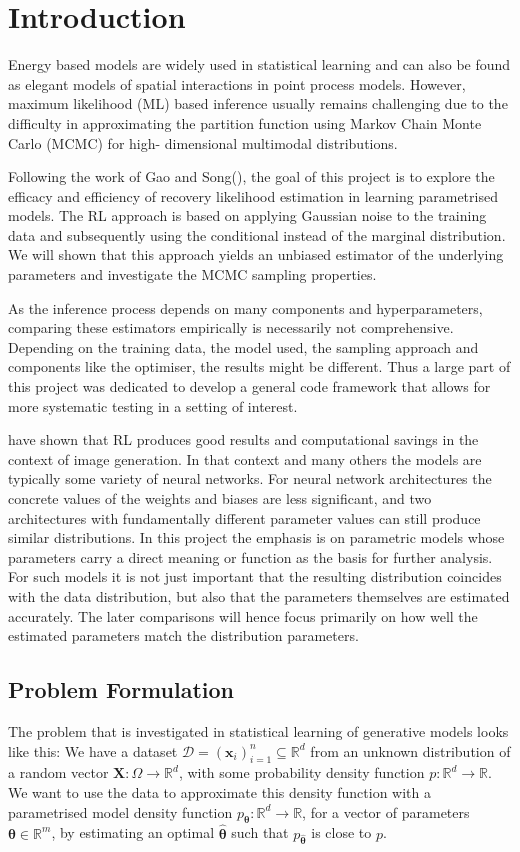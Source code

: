 \section{Introduction}

Energy based models are widely used in statistical learning and can also be found as elegant models of spatial interactions in point process models. 
However, maximum likelihood (ML) based inference usually remains challenging due to the difficulty in approximating the partition function using Markov Chain Monte Carlo (MCMC) for high- dimensional multimodal distributions.

Following the work of Gao and Song(\cite{Gao-Song2020}), the goal of this project is to explore the efficacy and efficiency of recovery likelihood estimation in learning parametrised models.
The RL approach is based on applying Gaussian noise to the training data and subsequently using the conditional instead of the marginal distribution.
We will shown that this approach yields an unbiased estimator of the underlying parameters and investigate the MCMC sampling properties. 

As the inference process depends on many components and hyperparameters, comparing these estimators empirically is necessarily not comprehensive.
Depending on the training data, the model used, the sampling approach and components like the optimiser, the results might be different.
Thus a large part of this project was dedicated to develop a general code framework that allows for more systematic testing in a setting of interest.

 have shown that RL produces good results and computational savings in the context of image generation.
In that context and many others the models are typically some variety of neural networks.
For neural network architectures the concrete values of the weights and biases are less significant, 
and two architectures with fundamentally different parameter values can still produce similar distributions.
In this project the emphasis is on parametric models whose parameters carry a direct meaning or function as the basis for further analysis.
For such models it is not just important that the resulting distribution coincides with the data distribution, 
but also that the parameters themselves are estimated accurately.
The later comparisons will hence focus primarily on how well the estimated parameters match the distribution parameters.

\subsection{Problem Formulation}
The problem that is investigated in statistical learning of generative models looks like this:
We have a dataset $\mathcal{D} = (\bm{x}_i)_{i = 1}^n \subseteq \mathbb{R}^d$ from an unknown distribution of a random vector $\bm{X} : \Omega \to \mathbb{R}^d$,
with some probability density function $p : \mathbb{R}^d \to \mathbb{R}$.
We want to use the data to approximate this density function with a parametrised model density function $p_{\bm{\theta}}: \mathbb{R}^d \to \mathbb{R}$,
for a vector of parameters $\bm{\theta} \in \mathbb{R}^m$, by estimating an optimal $\hat{\bm{\theta}}$ such that $p_{ \hat{\bm{\theta}} }$ is close to $p$.


